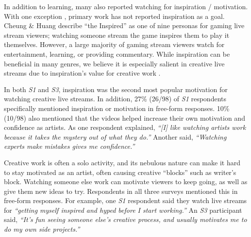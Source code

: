 In addition to learning, many also reported watching for inspiration / motivation. With one exception \cite{Cheung2011}, primary work has not reported inspiration as a goal. Cheung \& Huang \cite{Cheung2011} describe ``the Inspired'' as one of nine personas for gaming live stream viewers; watching someone stream the game inspires them to play it themselves. However, a large majority of gaming stream viewers watch for entertainment, learning, or providing commentary. While inspiration can be beneficial in many genres, we believe it is especially salient in creative live streams due to inspiration's value for creative work \cite{Herring2009}.

In both \textit{S1} and \textit{S3}, inspiration was the second most popular motivation for watching creative live streams. In addition, 27\% (26/98) of \textit{S1} respondents specifically mentioned inspiration or motivation in free-form responses. 10\% (10/98) also mentioned that the videos helped increase their own motivation and confidence as artists. As one respondent explained, \textit{``[I] like watching artists work because it takes the mystery out of what they do.''} Another said, \textit{``Watching experts make mistakes gives me confidence.''}

Creative work is often a solo activity, and its nebulous nature can make it hard to stay motivated as an artist, often causing creative ``blocks'' such as writer's block. Watching someone else work can motivate viewers to keep going, as well as give them new ideas to try. Respondents in all three surveys mentioned this in free-form responses. For example, one \textit{S1} respondent said they watch live streams for \textit{``getting myself inspired and hyped before I start working.''} An \textit{S3} participant said, \textit{``It's fun seeing someone else's creative process, and usually motivates me to do my own side projects.''}






